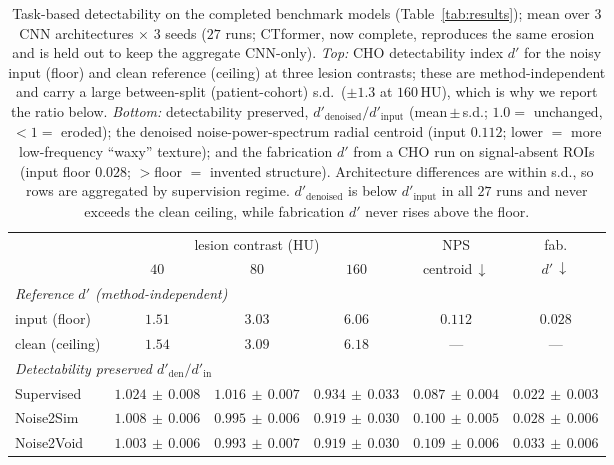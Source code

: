 \documentclass[letterpaper]{article} %
\begin{document}
\begin{table}[t]
  \centering
  \small
  \caption{Task-based detectability on the completed benchmark models
           (Table~\ref{tab:results}); mean over $3$ CNN architectures
           $\times$ $3$ seeds ($27$ runs; CTformer, now complete, reproduces the
           same erosion and is held out to keep the aggregate CNN-only).
           \emph{Top:} CHO detectability index $d'$ for the noisy
           input (floor) and clean reference (ceiling) at three lesion
           contrasts; these are method-independent and carry a large
           between-split (patient-cohort) s.d.\ ($\pm1.3$ at $160$\,HU), which is
           why we report the ratio below.  \emph{Bottom:} detectability
           preserved, $d'_\text{denoised}/d'_\text{input}$
           (mean\,$\pm$\,s.d.; $1.0=$ unchanged, $<1=$ eroded); the denoised
           noise-power-spectrum radial centroid (input $0.112$; lower $=$ more
           low-frequency ``waxy'' texture); and the fabrication $d'$ from
           a CHO run on signal-absent ROIs (input floor $0.028$; $>$floor
           $=$ invented structure).  Architecture differences are within s.d.,
           so rows are aggregated by supervision regime.  $d'_\text{denoised}$ is
           below $d'_\text{input}$ in all $27$ runs and never exceeds the clean
           ceiling, while fabrication $d'$ never rises above the floor.}
  \label{tab:detect}
  \begin{tabular}{lccccc}
    \toprule
     & \multicolumn{3}{c}{lesion contrast (HU)} & NPS & fab. \\
    \cmidrule(lr){2-4}
     & $40$ & $80$ & $160$ & centroid\,$\downarrow$ & $d'\,\downarrow$ \\
    \midrule
    \multicolumn{6}{l}{\emph{Reference $d'$ (method-independent)}} \\
    \quad input (floor)   & $1.51$ & $3.03$ & $6.06$ & $0.112$ & $0.028$ \\
    \quad clean (ceiling) & $1.54$ & $3.09$ & $6.18$ & --- & --- \\
    \midrule
    \multicolumn{6}{l}{\emph{Detectability preserved $d'_\text{den}/d'_\text{in}$}} \\
    \quad Supervised & $1.024\,{\pm}\,0.008$ & $1.016\,{\pm}\,0.007$ & $0.934\,{\pm}\,0.033$ & $0.087\,{\pm}\,0.004$ & $0.022\,{\pm}\,0.003$ \\
    \quad Noise2Sim  & $1.008\,{\pm}\,0.006$ & $0.995\,{\pm}\,0.006$ & $0.919\,{\pm}\,0.030$ & $0.100\,{\pm}\,0.005$ & $0.028\,{\pm}\,0.006$ \\
    \quad Noise2Void & $1.003\,{\pm}\,0.006$ & $0.993\,{\pm}\,0.007$ & $0.919\,{\pm}\,0.030$ & $0.109\,{\pm}\,0.006$ & $0.033\,{\pm}\,0.006$ \\
    \bottomrule
  \end{tabular}
\end{table}
\end{document}

